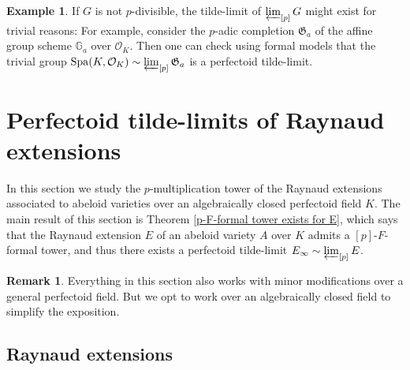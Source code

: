 \documentclass[10pt,oneside]{amsart}
\theoremstyle{definition}
\newtheorem{remark}[theorem]{Remark}
\newtheorem{example}[theorem]{Example}
\begin{document}
			
	\begin{example}
		If $G$ is not $p$-divisible, the tilde-limit of $\varprojlim_{[p]}G$ might exist for trivial reasons: For example, consider the $p$-adic completion  $\mathfrak G_a$  of the affine group scheme $\mathbb G_a$ over $\mathcal O_K$. Then one can check using formal models that the trivial group $\operatorname{Spa}(K,\mathcal O_K)\sim \varprojlim_{[p]}\mathfrak G_a$ is a perfectoid tilde-limit.
	\end{example}
	
 
	
 
	

	\section{Perfectoid tilde-limits of Raynaud extensions}\label{Raynaud extensions as principal bundles of formal and rigid spaces}
	In this section we study the $p$-multiplication tower of the Raynaud extensions associated to abeloid varieties over an algebraically closed perfectoid field $K$. The main result of this section is Theorem \ref{p-F-formal tower exists for E}, which says that the Raynaud extension $E$ of an abeloid variety $A$ over $K$ admits a $[p]$-$F$-formal tower, and thus there exists a perfectoid tilde-limit $E_\infty \sim \varprojlim_{[p]} E$.  
	
	
	\begin{remark}\label{Remark on dealing with general perfectoid fields by Galois descent}
		Everything in this section also works with minor modifications over a general perfectoid field. But we opt to work over an algebraically closed field to simplify the exposition.
	\end{remark}
	
	
	\subsection{Raynaud extensions}
	
\end{document}
